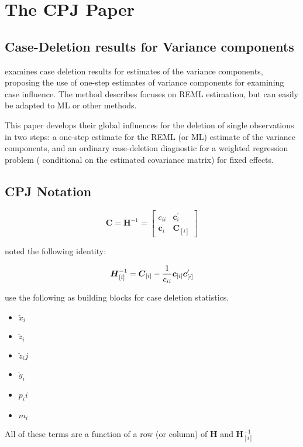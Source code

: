 \documentclass[Chap5amain.tex]{subfiles}
\begin{document}
\newpage

\newpage
\section{The CPJ Paper}%


\subsection{Case-Deletion results for Variance components}
\citet{CPJ} examines case deletion results for estimates of the variance components, proposing the use of one-step estimates of variance components for examining case influence. The method describes focuses on REML estimation, but can easily be adapted to ML or other methods.


This paper develops their global influences for the deletion of single observations in two steps: a one-step estimate for the REML (or ML) estimate of the variance components, and an ordinary case-deletion diagnostic for a weighted regression problem ( conditional on the estimated covariance matrix) for fixed effects.




\subsection{CPJ Notation} %


\[ \boldsymbol{C} = \boldsymbol{H}^{-1} = \left[
\begin{array}{cc}
c_{ii} & \boldsymbol{c}_{i}^{\prime}\\
\boldsymbol{c}_{i} &  \boldsymbol{C}_{[i]}
\end{array} \right]
\]


\citet{CPJ} noted the following identity:


\[ \boldsymbol{H}_{[i]}^{-1}  = \boldsymbol{C}_{[i]} - {1 \over c_{ii}}\boldsymbol{c}_{[i]}\boldsymbol{c}_{[i]}^{\prime} \]




\citet{CPJ} use the following as building blocks for case deletion statistics.
\begin{itemize}
\item $\breve{x}_i$
\item $\breve{z}_i$
\item $\breve{z}_ij$
\item $\breve{y}_i$
\item $p_ii$
\item $m_i$
\end{itemize}
All of these terms are a function of a row (or column) of $\boldsymbol{H}$ and $\boldsymbol{H}_{[i]}^{-1}$
\end{document}
